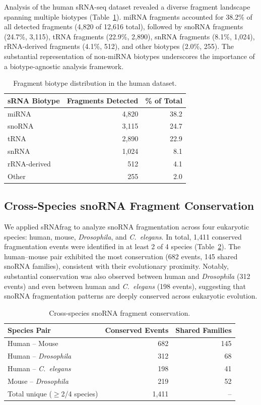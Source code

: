 \documentclass[11pt]{article}
\begin{document}
Analysis of the human sRNA-seq dataset revealed a diverse fragment landscape spanning multiple biotypes (Table~\ref{tab:biotype_dist}). miRNA fragments accounted for 38.2\% of all detected fragments (4,820 of 12,616 total), followed by snoRNA fragments (24.7\%, 3,115), tRNA fragments (22.9\%, 2,890), snRNA fragments (8.1\%, 1,024), rRNA-derived fragments (4.1\%, 512), and other biotypes (2.0\%, 255). The substantial representation of non-miRNA biotypes underscores the importance of a biotype-agnostic analysis framework.

\begin{table}[ht]
\centering
\caption{Fragment biotype distribution in the human dataset.}
\label{tab:biotype_dist}
\begin{tabular}{lrr}
\toprule
\textbf{sRNA Biotype} & \textbf{Fragments Detected} & \textbf{\% of Total} \\
\midrule
miRNA & 4,820 & 38.2 \\
snoRNA & 3,115 & 24.7 \\
tRNA & 2,890 & 22.9 \\
snRNA & 1,024 & 8.1 \\
rRNA-derived & 512 & 4.1 \\
Other & 255 & 2.0 \\
\bottomrule
\end{tabular}
\end{table}

\subsection{Cross-Species snoRNA Fragment Conservation}

We applied sRNAfrag to analyze snoRNA fragmentation across four eukaryotic species: human, mouse, \textit{Drosophila}, and \textit{C.~elegans}. In total, 1,411 conserved fragmentation events were identified in at least 2 of 4 species (Table~\ref{tab:conservation}). The human--mouse pair exhibited the most conservation (682 events, 145 shared snoRNA families), consistent with their evolutionary proximity. Notably, substantial conservation was also observed between human and \textit{Drosophila} (312 events) and even between human and \textit{C.~elegans} (198 events), suggesting that snoRNA fragmentation patterns are deeply conserved across eukaryotic evolution.

\begin{table}[ht]
\centering
\caption{Cross-species snoRNA fragment conservation.}
\label{tab:conservation}
\begin{tabular}{lrr}
\toprule
\textbf{Species Pair} & \textbf{Conserved Events} & \textbf{Shared Families} \\
\midrule
Human -- Mouse & 682 & 145 \\
Human -- \textit{Drosophila} & 312 & 68 \\
Human -- \textit{C.~elegans} & 198 & 41 \\
Mouse -- \textit{Drosophila} & 219 & 52 \\
\midrule
Total unique ($\geq$2/4 species) & 1,411 & -- \\
\bottomrule
\end{tabular}
\end{table}
\end{document}
